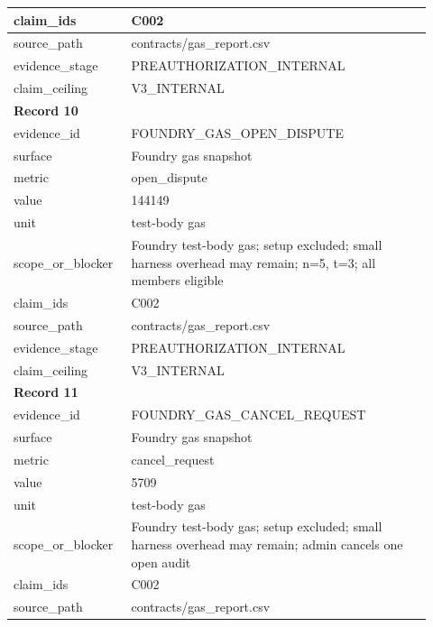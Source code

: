 \begin{longtable}{|p{0.24\linewidth}|p{0.68\linewidth}|}
claim\_\allowbreak{}ids & C002 \\ \hline
source\_\allowbreak{}path & contracts/gas\_\allowbreak{}report.csv \\ \hline
evidence\_\allowbreak{}stage & PREAUTHORIZATION\_\allowbreak{}INTERNAL \\ \hline
claim\_\allowbreak{}ceiling & V3\_\allowbreak{}INTERNAL \\ \hline
\multicolumn{2}{|l|}{\textbf{Record 10}} \\ \hline
evidence\_\allowbreak{}id & FOUNDRY\_\allowbreak{}GAS\_\allowbreak{}OPEN\_\allowbreak{}DISPUTE \\ \hline
surface & Foundry gas snapshot \\ \hline
metric & open\_\allowbreak{}dispute \\ \hline
value & 144149 \\ \hline
unit & test-body gas \\ \hline
scope\_\allowbreak{}or\_\allowbreak{}blocker & Foundry test-body gas;\allowbreak{} setup excluded;\allowbreak{} small harness overhead may remain;\allowbreak{} n=5, t=3;\allowbreak{} all members eligible \\ \hline
claim\_\allowbreak{}ids & C002 \\ \hline
source\_\allowbreak{}path & contracts/gas\_\allowbreak{}report.csv \\ \hline
evidence\_\allowbreak{}stage & PREAUTHORIZATION\_\allowbreak{}INTERNAL \\ \hline
claim\_\allowbreak{}ceiling & V3\_\allowbreak{}INTERNAL \\ \hline
\multicolumn{2}{|l|}{\textbf{Record 11}} \\ \hline
evidence\_\allowbreak{}id & FOUNDRY\_\allowbreak{}GAS\_\allowbreak{}CANCEL\_\allowbreak{}REQUEST \\ \hline
surface & Foundry gas snapshot \\ \hline
metric & cancel\_\allowbreak{}request \\ \hline
value & 5709 \\ \hline
unit & test-body gas \\ \hline
scope\_\allowbreak{}or\_\allowbreak{}blocker & Foundry test-body gas;\allowbreak{} setup excluded;\allowbreak{} small harness overhead may remain;\allowbreak{} admin cancels one open audit \\ \hline
claim\_\allowbreak{}ids & C002 \\ \hline
source\_\allowbreak{}path & contracts/gas\_\allowbreak{}report.csv \\ \hline

\end{longtable}
